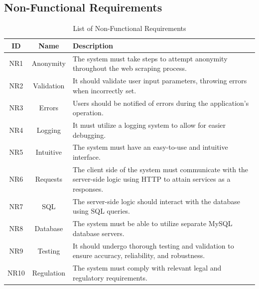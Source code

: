 \documentclass{thesis-ekf}
\theoremstyle{definition}
\theoremstyle{remark}
\begin{document}
\subsection{Non-Functional Requirements}
\begin{table}[H]
	\centering
	\begin{tabular}{|c|c|>{\raggedright\arraybackslash}p{10cm}|}
		\hline
		\textbf{ID} & \textbf{Name} & \textbf{Description} \\
		\hline
		NR1 & Anonymity & The system must take steps to attempt anonymity throughout the web scraping process. \\
		\hline
		NR2 & Validation & It should validate user input parameters, throwing errors when incorrectly set. \\
		\hline
		NR3 & Errors & Users should be notified of errors during the application's operation. \\
		\hline
		NR4 & Logging & It must utilize a logging system to allow for easier debugging. \\
		\hline
		NR5 & Intuitive & The system must have an easy-to-use and intuitive interface. \\
		\hline
		NR6 & Requests & The client side of the system must communicate with the server-side logic using HTTP to attain services as a responses. \\
		\hline
		NR7 & SQL & The server-side logic should interact with the database using SQL queries. \\
		\hline
		NR8 & Database & The system must be able to utilize separate MySQL database servers. \\
		\hline
		NR9 & Testing & It should undergo thorough testing and validation to ensure accuracy, reliability, and robustness. \\
		\hline
		NR10 & Regulation & The system must comply with relevant legal and regulatory requirements. \\
		\hline
	\end{tabular}
	\caption{List of Non-Functional Requirements}
	\label{table-non-funct-req}
\end{table}
\end{document}
